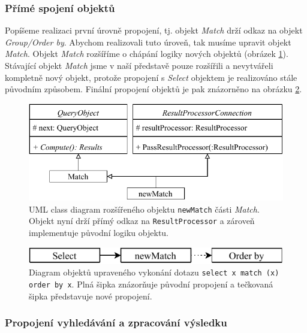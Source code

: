 \subsubsection{Přímé spojení objektů} \label{anal.improvement.con1}

Popíšeme realizaci první úrovně propojení, tj. objekt \textit{Match} drží odkaz na objekt \textit{Group/Order by}.
Abychom realizovali tuto úroveň, tak musíme upravit objekt \textit{Match}.
Objekt \textit{Match} rozšíříme o chápání logiky nových objektů (obrázek \ref{figure.diaStreamedQueryObjects}).
Stávající objekt \textit{Match} jsme v naší představě pouze rozšířili a nevytvářeli kompletně nový objekt, protože propojení s \textit{Select} objektem je realizováno stále původním způsobem.
Finální propojení objektů je pak znázorněno na obrázku \ref{figure.diaStreamedQueryObjectsCon}.

\begin{figure}[!htp]
\includegraphics{../img/diaStreamedQueryObjects.pdf}\centering
\caption{UML class diagram rozšířeného objektu \texttt{newMatch} části \textit{Match}. Objekt nyní drží přímý odkaz na \texttt{ResultProcessor} a zároveň implementuje původní logiku objektu.}
\label{figure.diaStreamedQueryObjects}
\end{figure}

\begin{figure}[!htp]
\includegraphics{../img/diaStreamedQueryObjectsCon.pdf}\centering
\caption{Diagram objektů upraveného vykonání dotazu \texttt{select x match (x) order by x}. Plná šipka znázorňuje původní propojení a tečkovaná šipka představuje nové propojení.}
\label{figure.diaStreamedQueryObjectsCon}
\end{figure}

\subsubsection{Propojení vyhledávání a zpracování výsledku} \label{anal.improvement.con2}

